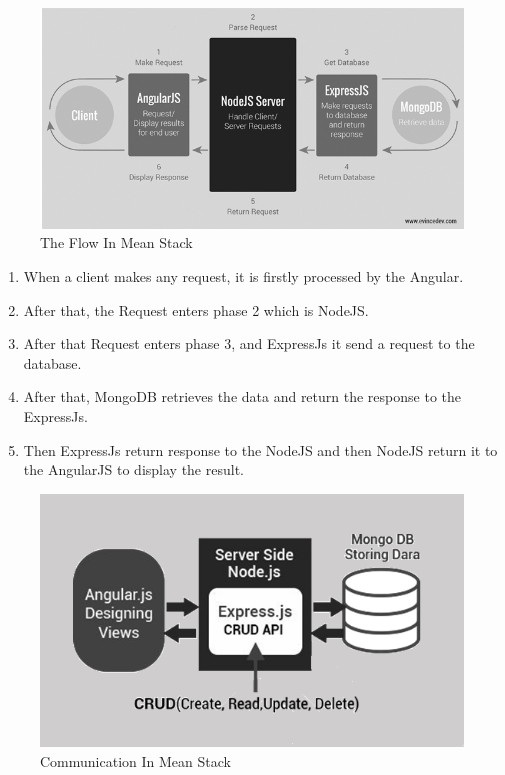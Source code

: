 \begin{figure}[!ht]
      \center
      \includegraphics[scale=0.50]{assets/meanphases.png}
      \caption{The Flow In Mean Stack}
      \label{fig:mean}
\end{figure}
\begin{enumerate}
      \item 
      When a client makes any request, it is firstly processed by the Angular.
      \item 
      After that, the Request enters phase 2 which is NodeJS.
      \item 
      After that Request enters phase 3, and ExpressJs it send a request to the database.
      \item 
      After that, MongoDB retrieves the data and return the response to the ExpressJs.
      \item 
      Then ExpressJs return response to the NodeJS and then NodeJS return it to the AngularJS to display the result.
\end{enumerate}

\begin{figure}[H]
      \center
      \includegraphics[scale=0.55]{assets/meanarchdesc.png}
      \caption{Communication In Mean Stack}
      \label{fig:mean}
\end{figure}


